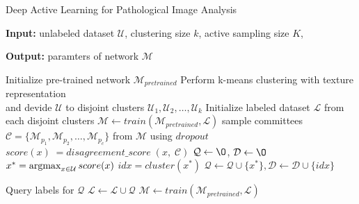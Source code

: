 \begin{algorithm}[h]
    \caption{Deep Active Learning for Pathological Image Analysis}
    \label{algo:dal}
    \begin{algorithmic}
        \STATE \textbf{Input: } 
        unlabeled dataset $\mathcal{U}$,
        clustering size $k$, 
        active sampling size $K$,
    \end{algorithmic}

    \begin{algorithmic}
        \STATE \textbf{Output: } paramters of network $\mathcal{M}$
    \end{algorithmic}
    
    \begin{algorithmic}[1]
        \STATE Initialize pre-trained network $\mathcal{M}_{pretrained}$
        \STATE Perform k-means clustering with texture representation \\
        and devide $\mathcal{U}$ to disjoint clusters $\mathcal{U}_1, \mathcal{U}_2, \dots, \mathcal{U}_k$
        \STATE Initialize labeled dataset $\mathcal{L}$ from each disjoint clusters
        \STATE $\mathcal{M} \leftarrow train (\mathcal{M}_{pretrained}, \mathcal{L})$
        \REPEAT
            \STATE sample committees $\mathcal{C} = \{\mathcal{M}_{p_1}, \mathcal{M}_{p_2}, \dots, \mathcal{M}_{p_c} \}$ from $\mathcal{M}$ using $dropout$ 
                \STATE $score (x) \; = disagreement\_score \; (x, \; \mathcal{C}) $
            \ENDFOR
            \STATE $\mathcal{Q} \leftarrow \O$, $\mathcal{D} \leftarrow \O$
            \STATE $x^{\ast} = \argmax_{x \in \mathcal{U}} score(x)$
            \STATE $idx = cluster(x^{\ast})$
            \STATE $\mathcal{Q} \leftarrow \mathcal{Q} \cup \{x^{\ast}\}, \mathcal{D} \leftarrow \mathcal{D} \cup \{idx\}$

            \ENDIF

            \ENDWHILE
            \STATE Query labels for $\mathcal{Q}$
            \STATE $\mathcal{L} \leftarrow \mathcal{L} \cup \mathcal{Q}$
            \STATE $\mathcal{M} \leftarrow train (\mathcal{M}_{pretrained}, \mathcal{L})$

    \end{algorithmic}
  \end{algorithm}
  